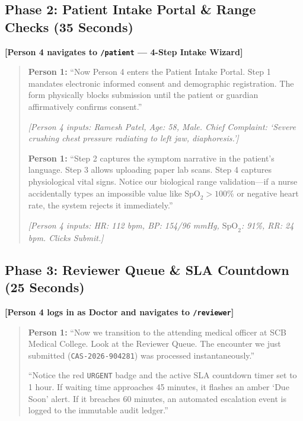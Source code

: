 \documentclass[11pt,a4paper]{article}
\begin{document}
\subsection*{Phase 2: Patient Intake Portal \& Range Checks (35 Seconds)}
\noindent \textbf{[Person 4 navigates to \texttt{/patient} --- 4-Step Intake Wizard]}
\begin{quote}
\textbf{Person 1:} ``Now Person 4 enters the Patient Intake Portal. Step 1 mandates electronic informed consent and demographic registration. The form physically blocks submission until the patient or guardian affirmatively confirms consent.''

\textit{[Person 4 inputs: Ramesh Patel, Age: 58, Male. Chief Complaint: `Severe crushing chest pressure radiating to left jaw, diaphoresis.']}

\textbf{Person 1:} ``Step 2 captures the symptom narrative in the patient's language. Step 3 allows uploading paper lab scans. Step 4 captures physiological vital signs. Notice our biological range validation---if a nurse accidentally types an impossible value like $\text{SpO}_2 > 100\%$ or negative heart rate, the system rejects it immediately.''

\textit{[Person 4 inputs: HR: 112 bpm, BP: 154/96 mmHg, $\text{SpO}_2$: 91\%, RR: 24 bpm. Clicks Submit.]}
\end{quote}

\subsection*{Phase 3: Reviewer Queue \& SLA Countdown (25 Seconds)}
\noindent \textbf{[Person 4 logs in as Doctor and navigates to \texttt{/reviewer}]}
\begin{quote}
\textbf{Person 1:} ``Now we transition to the attending medical officer at SCB Medical College. Look at the Reviewer Queue. The encounter we just submitted (\texttt{CAS-2026-904281}) was processed instantaneously.''

``Notice the red \texttt{URGENT} badge and the active SLA countdown timer set to 1 hour. If waiting time approaches 45 minutes, it flashes an amber `Due Soon' alert. If it breaches 60 minutes, an automated escalation event is logged to the immutable audit ledger.''
\end{quote}
\end{document}
